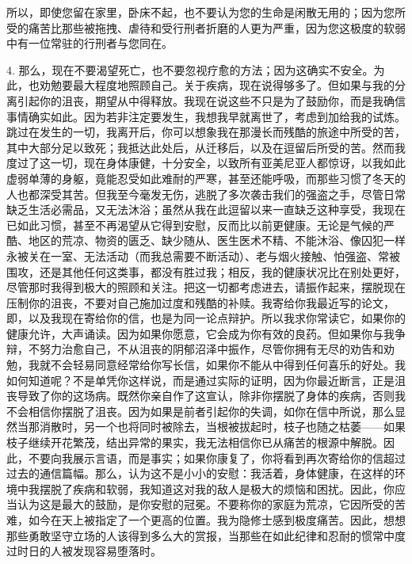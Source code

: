 所以，即使您留在家里，卧床不起，也不要认为您的生命是闲散无用的；因为您所受的痛苦比那些被拖拽、虐待和受行刑者折磨的人更为严重，因为您这极度的软弱中有一位常驻的行刑者与您同在。\par

4. 那么，现在不要渴望死亡，也不要忽视疗愈的方法；因为这确实不安全。为此，也劝勉要最大程度地照顾自己。关于疾病，现在说得够多了。但如果与我的分离引起你的沮丧，期望从中得释放。我现在说这些不只是为了鼓励你，而是我确信事情确实如此。因为若非注定要发生，我想我早就离世了，考虑到加给我的试炼。跳过在发生的一切，我离开后，你可以想象我在那漫长而残酷的旅途中所受的苦，其中大部分足以致死；我抵达此处后，从迁移后，以及在逗留后所受的苦。然而我度过了这一切，现在身体康健，十分安全，以致所有亚美尼亚人都惊讶，以我如此虚弱单薄的身躯，竟能忍受如此难耐的严寒，甚至还能呼吸，而那些习惯了冬天的人也都深受其苦。但我至今毫发无伤，逃脱了多次袭击我们的强盗之手，尽管日常缺乏生活必需品，又无法沐浴；虽然从我在此逗留以来一直缺乏这种享受，我现在已如此习惯，甚至不再渴望从它得到安慰，反而比以前更健康。无论是气候的严酷、地区的荒凉、物资的匮乏、缺少随从、医生医术不精、不能沐浴、像囚犯一样永被关在一室、无法活动（而我总需要不断活动）、老与烟火接触、怕强盗、常被围攻，还是其他任何这类事，都没有胜过我；相反，我的健康状况比在别处更好，尽管那时我得到极大的照顾和关注。把这一切都考虑进去，请振作起来，摆脱现在压制你的沮丧，不要对自己施加过度和残酷的补赎。我寄给你我最近写的论文，即，以及我现在寄给你的信，也是为同一论点辩护。所以我求你常读它，如果你的健康允许，大声诵读。因为如果你愿意，它会成为你有效的良药。但如果你与我争辩，不努力治愈自己，不从沮丧的阴郁沼泽中振作，尽管你拥有无尽的劝告和劝勉，我就不会轻易同意经常给你写长信，如果你不能从中得到任何喜乐的好处。我如何知道呢？不是单凭你这样说，而是通过实际的证明，因为你最近断言，正是沮丧导致了你的这场病。既然你亲自作了这宣认，除非你摆脱了身体的疾病，否则我不会相信你摆脱了沮丧。因为如果是前者引起你的失调，如你在信中所说，那么显然当那消散时，另一个也将同时被除去，当根被拔起时，枝子也随之枯萎——如果枝子继续开花繁茂，结出异常的果实，我无法相信你已从痛苦的根源中解脱。因此，不要向我展示言语，而是事实；如果你康复了，你将看到再次寄给你的信超过过去的通信篇幅。那么，认为这不是小小的安慰：我活着，身体健康，在这样的环境中我摆脱了疾病和软弱，我知道这对我的敌人是极大的烦恼和困扰。因此，你应当认为这是最大的鼓励，是你安慰的冠冕。不要称你的家庭为荒凉，它因所受的苦难，如今在天上被指定了一个更高的位置。我为隐修士感到极度痛苦。因此，想想那些勇敢坚守立场的人该得到多么大的赏报，当那些在如此纪律和忍耐的惯常中度过时日的人被发现容易堕落时。\par

